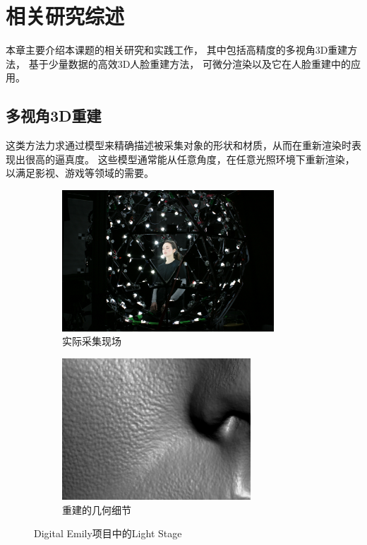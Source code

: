 \chapter{相关研究综述}
\label{chap:related_work}

本章主要介绍本课题的相关研究和实践工作，
其中包括高精度的多视角3D重建方法，
基于少量数据的高效3D人脸重建方法，
可微分渲染以及它在人脸重建中的应用。

\section{多视角3D重建}

这类方法力求通过模型来精确描述被采集对象的形状和材质，从而在重新渲染时表现出很高的逼真度。
这些模型通常能从任意角度，在任意光照环境下重新渲染，以满足影视、游戏等领域的需要。

\begin{figure}
\centering
\begin{subfigure}[b]{0.5\textwidth}
    \centering
    \includegraphics[height=150pt]{figures/light_stage}
    \caption{实际采集现场}
\end{subfigure}
\begin{subfigure}[b]{0.45\textwidth}
    \centering
    \includegraphics[height=150pt]{figures/emily_detail_1}
    \caption{重建的几何细节}
\end{subfigure}
\caption[Digital Emily 项目中的 Light Stage]{Digital Emily项目中的Light Stage\cite{DEP}}
\end{figure}


